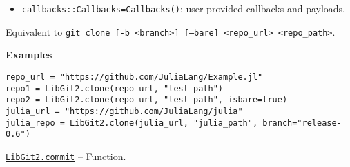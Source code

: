 \begin{adjustwidth}{2em}{0pt}
\begin{itemize}
\item \texttt{callbacks::Callbacks=Callbacks()}: user provided callbacks and payloads.

\end{itemize}
Equivalent to \texttt{git clone [-b <branch>] [--bare] <repo\_url> <repo\_path>}.

\textbf{Examples}


\begin{verbatim}
repo_url = "https://github.com/JuliaLang/Example.jl"
repo1 = LibGit2.clone(repo_url, "test_path")
repo2 = LibGit2.clone(repo_url, "test_path", isbare=true)
julia_url = "https://github.com/JuliaLang/julia"
julia_repo = LibGit2.clone(julia_url, "julia_path", branch="release-0.6")
\end{verbatim}



\end{adjustwidth}
\hypertarget{9554164652611238018}{}
\hyperlink{9554164652611238018}{\texttt{LibGit2.commit}}  -- {Function.}

